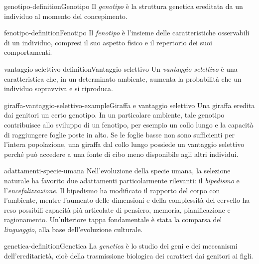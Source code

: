 \documentclass[preview]{standalone}
\begin{document}
\begin{snippetdefinition}{genotipo-definition}{Genotipo}
    Il \emph{genotipo} è la struttura genetica ereditata da un individuo al
    momento del concepimento.
\end{snippetdefinition}

\begin{snippetdefinition}{fenotipo-definition}{Fenotipo}
    Il \emph{fenotipo} è l'insieme delle caratteristiche osservabili di un
    individuo, compresi il suo aspetto fisico e il repertorio dei suoi
    comportamenti.
\end{snippetdefinition}

\begin{snippetdefinition}{vantaggio-selettivo-definition}{Vantaggio selettivo}
    Un \emph{vantaggio selettivo} è una caratteristica che, in un determinato
    ambiente, aumenta la probabilità che un individuo sopravviva e si riproduca.
\end{snippetdefinition}

\begin{snippetexample}{giraffa-vantaggio-selettivo-example}{Giraffa e vantaggio selettivo}
    Una giraffa eredita dai genitori un certo genotipo. In un particolare
    ambiente, tale genotipo contribuisce allo sviluppo di un fenotipo, per
    esempio un collo lungo e la capacità di raggiungere foglie poste in alto.
    Se le foglie basse non sono sufficienti per l'intera popolazione, una
    giraffa dal collo lungo possiede un vantaggio selettivo perché può accedere
    a una fonte di cibo meno disponibile agli altri individui.
\end{snippetexample}

\begin{snippet}{adattamenti-specie-umana}
    Nell'evoluzione della specie umana, la selezione naturale ha favorito due
    adattamenti particolarmente rilevanti: il \emph{bipedismo} e
    l'\emph{encefalizzazione}. Il bipedismo ha modificato il rapporto del corpo
    con l'ambiente, mentre l'aumento delle dimensioni e della complessità del
    cervello ha reso possibili capacità più articolate di pensiero, memoria,
    pianificazione e ragionamento. Un'ulteriore tappa fondamentale è stata la
    comparsa del \emph{linguaggio}, alla base dell'evoluzione culturale.
\end{snippet}

\begin{snippetdefinition}{genetica-definition}{Genetica}
    La \emph{genetica} è lo studio dei geni e dei meccanismi dell'ereditarietà,
    cioè della trasmissione biologica dei caratteri dai genitori ai figli.
\end{snippetdefinition}
\end{document}
